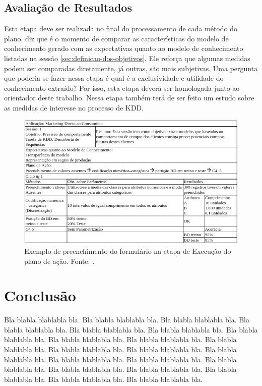 \documentclass[diss,capa]{texufpel}
\begin{document}
\section{Avaliação de Resultados}
\label{sec:avaliacao-de-resultados}

Esta etapa deve ser realizada no final do processamento de cada método do plano. \citet{goldschmidt2015data} diz que é o momento de comparar as características do modelo de conhecimento gerado com as expectativas quanto ao modelo de conhecimento listadas na sessão \ref{sec:definicao-dos-objetivos}. Ele reforça que algumas medidas podem ser comparadas diretamente, já outras, são mais subjetivas. Uma pergunta que poderia se fazer nessa etapa é qual é a exclusividade e utilidade do conhecimento extraído? Por isso, esta etapa deverá ser homologada junto ao orientador deste trabalho. Nessa etapa também terá de ser feito um estudo sobre as medidas de interesse no processo de KDD.

\begin{figure}[htbp]
  \centering \includegraphics[scale=.4]{imagens/formulario-etapa-execucao-dos-planos-de-acao.png}
  \caption{Exemplo de preenchimento do formulário na etapa de Execução do plano de ação. Fonte: \cite{goldschmidt2015data}.}
  \label{fig:formulario-etapa-execucao-dos-planos-de-acao}
\end{figure}





\chapter{Conclusão}

Bla blabla blablabla bla.  Bla blabla blablabla bla.  Bla blabla
blablabla bla.  Bla blabla blablabla bla.  Bla blabla blablabla bla.
Bla blabla blablabla bla.  Bla blabla blablabla bla.  Bla blabla
blablabla bla.  Bla blabla blablabla bla.  Bla blabla blablabla bla.
Bla blabla blablabla bla.  Bla blabla blablabla bla.  Bla blabla
blablabla bla.  Bla blabla blablabla bla.  Bla blabla blablabla bla.
Bla blabla blablabla bla.  Bla blabla blablabla bla.  Bla blabla
blablabla bla.  Bla blabla blablabla bla.  Bla blabla blablabla bla.
Bla blabla blablabla bla.
\end{document}
